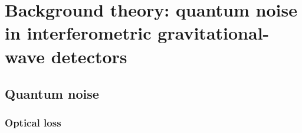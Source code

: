 \chapter{Background theory: quantum noise in interferometric gravitational-wave detectors} %
\label{chp:background_theory}







\section{Quantum noise}
\label{sec:qnoise}






\subsection{Optical loss}



